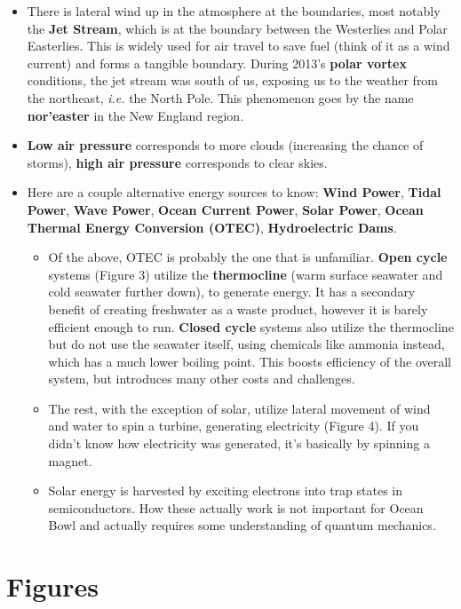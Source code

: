 \documentclass{article}
\begin{document}
\begin{itemize}
	\item There is lateral wind up in the atmosphere at the boundaries, most notably the \textbf{Jet Stream}, which is at the boundary between the Westerlies and Polar Easterlies. This is widely used for air travel to save fuel (think of it as a wind current) and forms a tangible boundary. During 2013's \textbf{polar vortex} conditions, the jet stream was south of us, exposing us to the weather from the northeast, \textit{i.e.} the North Pole. This phenomenon goes by the name \textbf{nor'easter} in the New England region.
	
	\item \textbf{Low air pressure} corresponds to more clouds (increasing the chance of storms), \textbf{high air pressure} corresponds to clear skies.
	
	\item Here are a couple alternative energy sources to know: \textbf{Wind Power}, \textbf{Tidal Power}, \textbf{Wave Power}, \textbf{Ocean Current Power}, \textbf{Solar Power}, \textbf{Ocean Thermal Energy Conversion (OTEC)}, \textbf{Hydroelectric Dams}.
	\begin{itemize}
		\item Of the above, OTEC is probably the one that is unfamiliar. \textbf{Open cycle} systems (Figure 3) utilize the \textbf{thermocline} (warm surface seawater and cold seawater further down), to generate energy. It has a secondary benefit of creating freshwater as a waste product, however it is barely efficient enough to run. \textbf{Closed cycle} systems also utilize the thermocline but do not use the seawater itself, using chemicals like ammonia instead, which has a much lower boiling point. This boosts efficiency of the overall system, but introduces many other costs and challenges.
		\item The rest, with the exception of solar, utilize lateral movement of wind and water to spin a turbine, generating electricity (Figure 4). If you didn't know how electricity was generated, it's basically by spinning a magnet.
		\item Solar energy is harvested by exciting electrons into trap states in semiconductors. How these actually work is not important for Ocean Bowl and actually requires some understanding of quantum mechanics.
	\end{itemize}
\end{itemize}

\section{Figures}
\end{document}
